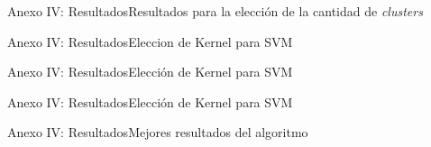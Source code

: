 \documentclass{beamer}
\begin{document}
	\begin{frame}{Anexo IV: Resultados}{Resultados para la elección de la cantidad de \textit{clusters}}
		\begin{table}[tb]
			\centering
			\caption{Tabla comparativa del \textit{Accuracy} obtenido utilizando distintos valores de $K$.}
			\label{tabla:accuracy_K}
		\end{table}
	\end{frame}
	
	
	\begin{frame}{Anexo IV: Resultados}{Eleccion de Kernel para SVM}
		\begin{table}[b]
			\centering
			\caption{Mejores resultados obtenidos por el Kernel RBF.}
			\label{tabla:svm_rbf}
		\end{table}
	\end{frame}
	
	
	\begin{frame}{Anexo IV: Resultados}{Elección de Kernel para SVM}
		\begin{table}[tb]
			\centering
			\caption{Mejores resultados obtenidos por el Kernel Lineal.}
			\label{tabla:svm_lineal}
		\end{table}
	\end{frame}
	
	\begin{frame}{Anexo IV: Resultados}{Elección de Kernel para SVM}
		\begin{table}[tb]
			\centering
			\caption{Mejores resultados obtenidos por el Kernel Polinomial.}
			\label{tabla:svm_poly}
		\end{table}
	\end{frame}
	
	\begin{frame}{Anexo IV: Resultados}{Mejores resultados del algoritmo}
		\begin{table}[bt]
			\centering
			\caption{Resultados obtenidos utilizando las mejores variables obtenidas en el proceso de experimentos.}
			\label{tabla:exp:accuracy}
		\end{table}
	\end{frame}
	
\end{document}
